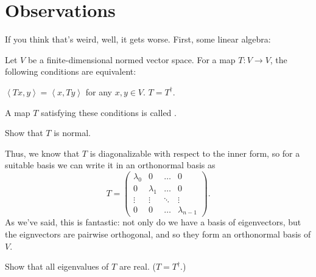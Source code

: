 \documentclass[11pt]{scrreprt}
\begin{document}
\section{Observations}
If you think that's weird, well, it gets worse.
First, some linear algebra:
\begin{definition}
	Let $V$ be a finite-dimensional normed vector space.
	For a map $T: V \to V$, the following conditions are equivalent:
	\begin{itemize}
		\ii $\left< Tx, y\right> = \left< x, Ty \right>$
		for any $x,y \in V$.
		\ii $T = T^\dagger$.
	\end{itemize}
	A map $T$ satisfying these conditions is called .
\end{definition}
\begin{ques}
	Show that $T$ is normal.
\end{ques}
Thus, we know that $T$ is diagonalizable
with respect to the inner form, so for a suitable basis we
can write it in an orthonormal basis as
\[
	T = \begin{pmatrix}
		\lambda_0 & 0 & \dots & 0 \\
		0 & \lambda_1 & \dots & 0 \\
		\vdots & \vdots & \ddots & \vdots \\
		0 & 0 & \dots & \lambda_{n-1}
	\end{pmatrix}.
\]
As we've said, this is fantastic:
not only do we have a basis of eigenvectors,
but the eignvectors are pairwise orthogonal,
and so they form an orthonormal basis of $V$.
\begin{ques}
	Show that all eigenvalues of $T$ are real.
	($T = T^\dagger$.)
\end{ques}
\end{document}
